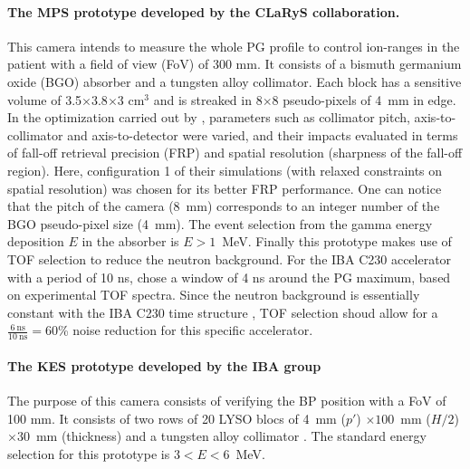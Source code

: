 \documentclass[a4paper,english,12pt]{article}
\begin{document}
\paragraph{The MPS prototype developed by the CLaRyS collaboration.}
This camera intends to measure the whole PG profile to control ion-ranges in the patient with a field of view (FoV) of 300 mm. It consists of a bismuth germanium oxide (BGO) absorber and a tungsten alloy collimator. Each block has a sensitive volume of 3.5$\times$3.8$\times$3 cm$^{3}$ and is streaked in 8$\times$8 pseudo-pixels of 4~mm in edge. In the optimization carried out by \cite{Pinto2014a}, parameters such as collimator pitch, axis-to-collimator and axis-to-detector were varied, and their impacts evaluated in terms of fall-off retrieval precision (FRP) and spatial resolution (sharpness of the fall-off region). Here, configuration 1 of their simulations (with relaxed constraints on spatial resolution) was chosen for its better FRP performance. One can notice that the pitch of the camera (8~mm) corresponds to an integer number of the BGO pseudo-pixel size (4~mm). The event selection from the gamma energy deposition $E$ in the absorber is $E>1$~MeV. Finally this prototype makes use of TOF selection to reduce the neutron background. For the IBA C230 accelerator with a period of 10 ns, \cite{Pinto2014a} chose a window of 4 ns around the PG maximum, based on experimental TOF spectra. Since the neutron background is essentially constant with the IBA C230 time structure \citep{Pinto2014a}, TOF selection shoud allow for a $\frac{6~\text{ns}}{10~\text{ns}}=60$\% noise reduction for this specific accelerator.

\paragraph{The KES prototype developed by the IBA group}

The purpose of this camera consists of verifying the BP position with a FoV of 100 mm. It consists of two rows of 20 LYSO blocs of 4~mm ($p'$) $\times 100$~mm ($H/2$) $\times30$~mm (thickness) and a tungsten alloy collimator \citep{Perali2014,Sterpin2015}. The standard energy selection for this prototype is $3<E<6$~MeV.
\end{document}
